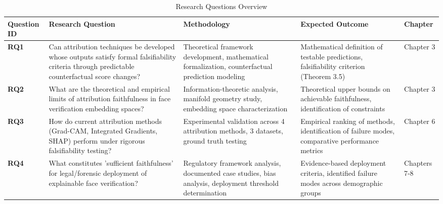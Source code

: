 
\begin{table}[htbp]
\centering
\caption{Research Questions Overview}
\label{tab:research_questions}
\small
\begin{tabularx}{\textwidth}{>{\centering\arraybackslash}p{}X>{\raggedright\arraybackslash}p{}>{\raggedright\arraybackslash}p{}p{}}
\toprule
\textbf{Question ID} & \textbf{Research Question} & \textbf{Methodology} & \textbf{Expected Outcome} & \textbf{Chapter} \\
\midrule
\textbf{RQ1} & Can attribution techniques be developed whose outputs satisfy formal falsifiability criteria through predictable counterfactual score changes? & Theoretical framework development, mathematical formalization, counterfactual prediction modeling & Mathematical definition of testable predictions, falsifiability criterion (Theorem 3.5) & Chapter 3 \\[8pt]

\textbf{RQ2} & What are the theoretical and empirical limits of attribution faithfulness in face verification embedding spaces? & Information-theoretic analysis, manifold geometry study, embedding space characterization & Theoretical upper bounds on achievable faithfulness, identification of constraints & Chapter 3 \\[8pt]

\textbf{RQ3} & How do current attribution methods (Grad-CAM, Integrated Gradients, SHAP) perform under rigorous falsifiability testing? & Experimental validation across 4 attribution methods, 3 datasets, ground truth testing & Empirical ranking of methods, identification of failure modes, comparative performance metrics & Chapter 6 \\[8pt]

\textbf{RQ4} & What constitutes 'sufficient faithfulness' for legal/forensic deployment of explainable face verification? & Regulatory framework analysis, documented case studies, bias analysis, deployment threshold determination & Evidence-based deployment criteria, identified failure modes across demographic groups & Chapters 7-8 \\
\bottomrule
\end{tabularx}
\end{table}

